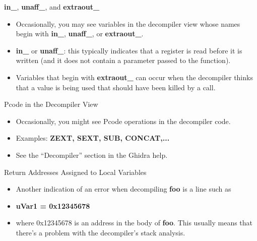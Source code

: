 \documentclass{beamer}
\begin{document}
\begin{frame}
\begin{block}{\textbf{in\_}, \textbf{unaff\_}, and \textbf{extraout\_}}
\begin{itemize}
\item Occasionally, you may see variables in the decompiler view whose names begin with \textbf{in\_}, \textbf{unaff\_}, or \textbf{extraout\_}.
\item \textbf{in\_} or \textbf{unaff\_}: this typically indicates that a register is read before it is written (and it does not contain a parameter passed to the function).
\item Variables that begin with \textbf{extraout\_} can occur when the decompiler thinks that a value is being used that should have been killed by a call. 
\end{itemize}
\end{block}
\end{frame}

\begin{frame}
\begin{block}{Pcode in the Decompiler View}
\begin{itemize}
\item Occasionally, you might see Pcode operations in the decompiler code. 
\item Examples: \textbf{ZEXT, SEXT, SUB, CONCAT,...}
\item See the ``Decompiler'' section in the Ghidra help. 
\end{itemize}
\end{block}
\end{frame}

\begin{frame}
\begin{block}{Return Addresses Assigned to Local Variables}
\begin{itemize}
\item Another indication of an error when decompiling \textbf{foo} is a line such as
\item[] \textbf{uVar1 = 0x12345678} 
\item[] where 0x12345678 is an address in the body of \textbf{foo}.  This usually means that there's a problem with the decompiler's stack analysis.
\end{itemize}
\end{block}
\end{frame}
\end{document}
